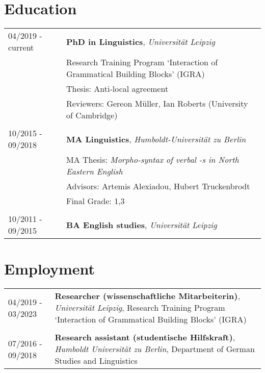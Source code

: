 \documentclass[11pt]{article}
\begin{document}


\section*{Education}



\begin{flushleft}
	\begin{tabularx}{\textwidth}{@{}p{}>{\RaggedRight\arraybackslash}p{}@{}}
		04/2019 - current & \textbf{PhD in Linguistics}, \textit{Universität Leipzig}\\
		& Research Training Program `Interaction of Grammatical Building Blocks' (IGRA) \\
		& Thesis: Anti-local agreement \\
		& Reviewers: Gereon Müller, Ian Roberts (University of Cambridge) \\
		& \\
		10/2015 - 09/2018 & \textbf{MA Linguistics}, \textit{Humboldt-Universität zu Berlin} \\
		& MA Thesis: \textit{Morpho-syntax of verbal \textit{-s} in North Eastern English} \\
		& Advisors: Artemis Alexiadou, Hubert Truckenbrodt\\
		& Final Grade: 1,3\\
		& \\
		10/2011 - 09/2015 & \textbf{BA English studies}, \textit{Universität Leipzig} \\
	\end{tabularx}
\end{flushleft}

\section*{Employment}

\begin{flushleft}
	\begin{tabularx}{\textwidth}{@{}p{}>{\RaggedRight\arraybackslash}p{}@{}}
		04/2019 - 03/2023 & \textbf{Researcher (wissenschaftliche Mitarbeiterin)}, \textit{Universität Leipzig}, Research Training Program `Interaction of Grammatical Building Blocks' (IGRA) \\
		& \\
		07/2016 - 09/2018 & \textbf{Research assistant (studentische Hilfskraft)}, \textit{Humboldt Universität zu Berlin}, Department of German Studies and Linguistics \\
	\end{tabularx}
\end{flushleft}
\end{document}

